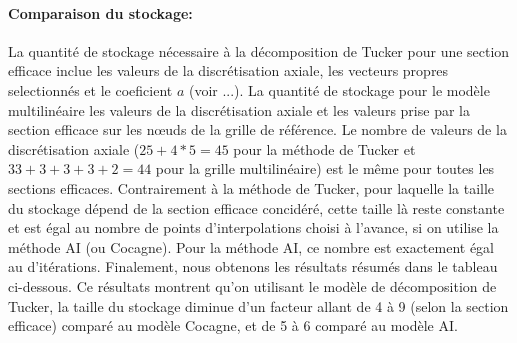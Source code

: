 \paragraph{Comparaison du stockage:\\}
\hspace{0.5cm} La quantité de stockage nécessaire à la décomposition de Tucker pour une section efficace inclue les valeurs de la discrétisation axiale, les vecteurs propres selectionnés et le coeficient $a$ (voir ...).
La quantité de stockage pour le modèle multilinéaire les valeurs de la discrétisation axiale et les valeurs prise par la section efficace sur les nœuds de la grille de référence. Le nombre de valeurs de la discrétisation
axiale ($25+4*5=45$ pour la méthode de Tucker et $33+3+3+3+2=44$ pour la grille multilinéaire) est le même pour toutes les sections efficaces.
\hspace{0.5cm} Contrairement à la méthode de Tucker, pour laquelle la taille du stockage dépend de la section efficace concidéré, cette taille là reste constante et est égal au nombre de points d'interpolations choisi à l'avance, si on utilise la méthode AI (ou Cocagne).
Pour la méthode AI, ce nombre est exactement égal au d'itérations.
Finalement, nous obtenons les résultats résumés dans le tableau ci-dessous. Ce résultats montrent qu'on utilisant le modèle de décomposition de Tucker, la
taille du stockage diminue d'un facteur allant de 4 à 9 (selon la section efficace) comparé au modèle Cocagne, et de 5 à 6 comparé au modèle AI.
